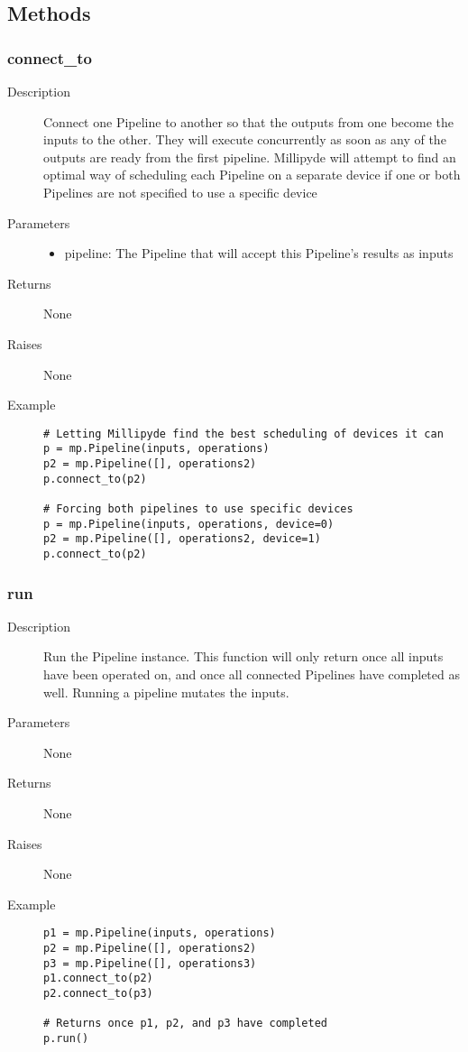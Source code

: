 \subsection{Methods}

\subsubsection{connect\_to}

\begin{description}
   \item[Description] Connect one Pipeline to another so that the outputs from one become the inputs to the other. They will execute concurrently as soon as any of the outputs are ready from the first pipeline. Millipyde will attempt to find an optimal way of scheduling each Pipeline on a separate device if one or both Pipelines are not specified to use a specific device
   \item[Parameters] \phantom{}
   \begin{itemize}
       \item pipeline: The Pipeline that will accept this Pipeline's results as inputs
   \end{itemize}
   \item[Returns] None
   \item[Raises] None
   \item[Example] \phantom{}
   \begin{lstlisting}
# Letting Millipyde find the best scheduling of devices it can
p = mp.Pipeline(inputs, operations)
p2 = mp.Pipeline([], operations2)
p.connect_to(p2)

# Forcing both pipelines to use specific devices
p = mp.Pipeline(inputs, operations, device=0)
p2 = mp.Pipeline([], operations2, device=1)
p.connect_to(p2)

\end{lstlisting}
\end{description}

\subsubsection{run}

\begin{description}
   \item[Description] Run the Pipeline instance. This function will only return once all inputs have been operated on, and once all connected Pipelines have completed as well. Running a pipeline mutates the inputs.
   \item[Parameters] None
   \item[Returns] None
   \item[Raises] None
   \item[Example] \phantom{}
   \begin{lstlisting}
p1 = mp.Pipeline(inputs, operations)
p2 = mp.Pipeline([], operations2)
p3 = mp.Pipeline([], operations3)
p1.connect_to(p2)
p2.connect_to(p3)

# Returns once p1, p2, and p3 have completed
p.run()

\end{lstlisting}
\end{description}

